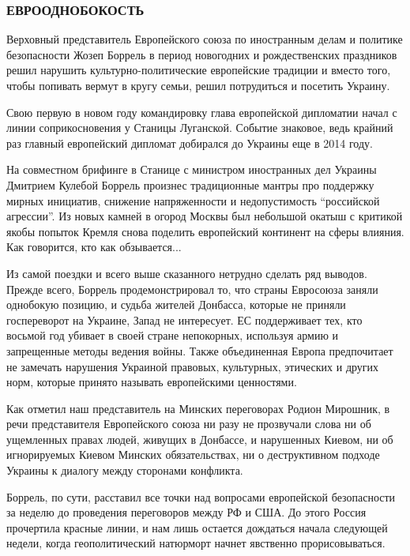 \subsubsection{ЕВРООДНОБОКОСТЬ}

Верховный представитель Европейского союза по иностранным делам и политике
безопасности Жозеп Боррель в период новогодних и рождественских праздников
решил нарушить культурно-политические европейские традиции и вместо того, чтобы
попивать вермут в кругу семьи, решил потрудиться и посетить Украину.

Свою первую в новом году командировку глава европейской дипломатии начал с
линии соприкосновения у Станицы Луганской. Событие знаковое, ведь крайний раз
главный европейский дипломат добирался до Украины еще в 2014 году.

На совместном брифинге в Станице с министром иностранных дел Украины Дмитрием
Кулебой Боррель произнес традиционные мантры про поддержку мирных инициатив,
снижение напряженности и недопустимость \enquote{российской агрессии}. Из новых камней
в огород Москвы был небольшой окатыш с критикой якобы попыток Кремля снова
поделить европейский континент на сферы влияния. Как говорится, кто как
обзывается...

Из самой поездки и всего выше сказанного нетрудно сделать ряд выводов. Прежде
всего, Боррель продемонстрировал то, что страны Евросоюза заняли однобокую
позицию, и судьба жителей Донбасса, которые не приняли госпереворот на Украине,
Запад не интересует. ЕС поддерживает тех, кто восьмой год убивает в своей
стране непокорных, используя армию и запрещенные методы ведения войны. Также
объединенная Европа предпочитает не замечать нарушения Украиной правовых,
культурных, этических и других норм, которые принято называть европейскими
ценностями.

Как отметил наш представитель на Минских переговорах Родион Мирошник, в речи
представителя Европейского союза ни разу не прозвучали слова ни об ущемленных
правах людей, живущих в Донбассе, и нарушенных Киевом, ни об игнорируемых
Киевом Минских обязательствах, ни о деструктивном подходе Украины к диалогу
между сторонами конфликта.

Боррель, по сути, расставил все точки над вопросами европейской безопасности за
неделю до проведения переговоров между РФ и США. До этого Россия прочертила
красные линии, и нам лишь остается дождаться начала следующей недели, когда
геополитический натюрморт начнет явственно прорисовываться.
